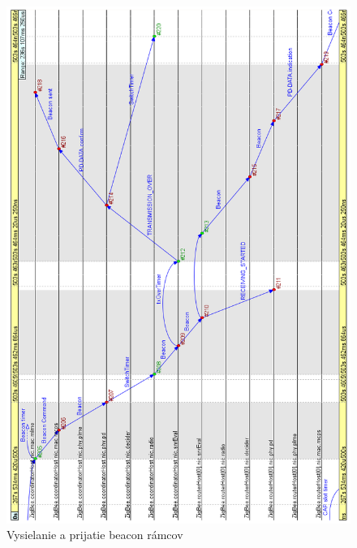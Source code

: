 \begin{figure}[htbp]
\begin{center}
\includegraphics[width=140mm]{figures/chart_beacon}
\caption{Vysielanie a prijatie beacon rámcov}
\label{fig:chart_beacon}
\end{center}
\end{figure}

